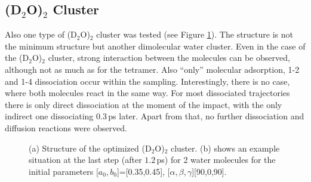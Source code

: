 \documentclass[11pt,DIV=13,BCOR=5mm,a4paper,headinclude]{scrbook}
\begin{document}
\subsection{(D$_2$O)$_2$ Cluster}
Also one type of (D$_2$O)$_2$ cluster was tested (see Figure \ref{abb:D2O2clusters}).
The structure is not the minimum structure but another dimolecular water cluster.
Even in the case of the (D$_2$O)$_2$ cluster, strong interaction between the molecules can be observed, although not as much as for the tetramer.
Also ``only'' molecular adsorption, 1-2 and 1-4 dissociation occur within the sampling.
Interestingly, there is no case, where both molecules react in the same way.
For most dissociated trajectories there is only direct dissociation at the moment of the impact, with the only indirect one dissociating $0.3\,$ps later.
Apart from that, no further dissociation and diffusion reactions were observed.
\begin{figure}[!t]
\centering
{}
         \quad
{}
          \quad
\caption{(a) Structure of the optimized (D$_2$O)$_2$ cluster.
(b) shows an example situation at the last step (after $1.2\,$ps) for 2 water molecules for the initial parameters [$a_0,b_0$]=[0.35,0.45], [$\alpha,\beta,\gamma$][90,0,90].}
       \label{abb:D2O2clusters}
\end{figure}
\end{document}
